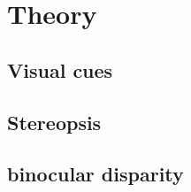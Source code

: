 \chapter{Theory}
	\section{Visual cues}
		
	
	\section{Stereopsis}
		
	
	\section{binocular disparity}
		